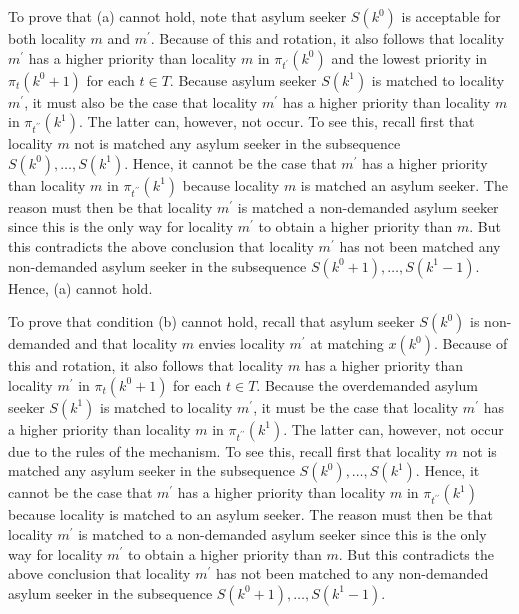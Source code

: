 \documentclass[12pt,fleqn]{article}
\begin{document}
To prove that (a) cannot hold, note that asylum seeker $S(k^0)$ is acceptable for both locality $m$ and $m^\prime$. Because of this and rotation, it also follows that locality $m^\prime$ has a higher priority than locality $m$ in $\pi_{t^\prime}(k^0)$ and the lowest priority in $\pi_t(k^0+1)$ for each $t\in T$. Because asylum seeker $S(k^1)$ is matched to locality $m^\prime$, it must also be the case that locality $m^\prime$ has a higher priority than locality $m$ in $\pi_{t^{\prime\prime}}(k^1)$. The latter can, however, not occur. To see this, recall first that locality $m$ not is matched any asylum seeker in the subsequence $S(k^0),\ldots,S(k^1)$. Hence, it cannot be the case that $m^\prime$ has a higher priority than locality $m$ in $\pi_{t^{\prime\prime}}(k^1)$ because locality $m$ is matched an asylum seeker. The reason must then be that locality $m^\prime$ is matched a non-demanded asylum seeker since this is the only way for locality $m^\prime$ to obtain a higher priority than $m$. But this contradicts the above conclusion that locality $m^\prime$ has not been matched any non-demanded asylum seeker in the subsequence $S(k^0+1),\ldots,S(k^1-1)$. Hence, (a) cannot hold.

To prove that condition (b) cannot hold, recall that asylum seeker $S(k^0)$ is non-demanded and that locality $m$ envies locality $m^\prime$ at matching $x(k^0)$. Because of this and rotation, it also follows that locality $m$ has a higher priority than locality $m^\prime$ in $\pi_t(k^0+1)$ for each $t\in T$. Because the overdemanded asylum seeker $S(k^1)$ is matched to locality $m^\prime$, it must be the case that locality $m^\prime$ has a higher priority than locality $m$ in $\pi_{t^{\prime\prime}}(k^1)$. The latter can, however, not occur due to the rules of the mechanism. To see this, recall first that locality $m$ not is matched any asylum seeker in the subsequence $S(k^0),\ldots,S(k^1)$. Hence, it cannot be the case that $m^\prime$ has a higher priority than locality $m$ in $\pi_{t^{\prime\prime}}(k^1)$ because locality is matched to an asylum seeker. The reason must then be that locality $m^\prime$ is matched to a non-demanded asylum seeker since this is the only way for locality $m^\prime$ to obtain a higher priority than $m$. But this contradicts the above conclusion that locality $m^\prime$ has not been matched to any non-demanded asylum seeker in the subsequence $S(k^0+1),\ldots,S(k^1-1)$.
\end{document}
